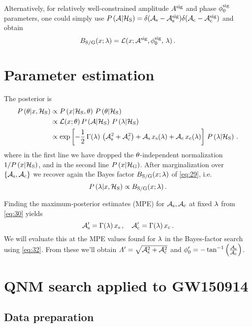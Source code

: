 \documentclass[aps,prd,onecolumn,notitlepage,nofootinbib,superscriptaddress,altaffilletter,floatfix]{revtex4-1}
\begin{document}
Alternatively, for relatively well-constrained amplitude $A^{{\mathrm{sig}}}$ and phase $\phi_0^{\mathrm{sig}}$ parameters, one could simply use $P\left(\mathcal{A}|\mathcal{H}_{\mathrm{S}}\right) = \delta(\mathcal{A}_{\mathrm{s}}-\mathcal{A}_{\mathrm{s}}^{\mathrm{sig}})\delta(\mathcal{A}_{\mathrm{c}}-\mathcal{A}_{\mathrm{c}}^{\mathrm{sig}})$ and obtain
\begin{equation}
  \label{eq:24}
  B_{\mathrm{S/G}}(x;\lambda) = \mathcal{L}(x;\mathcal{A}^{\mathrm{sig}},\phi_0^{\mathrm{sig}},\,\lambda)\,.
\end{equation}

\section{Parameter estimation}
\label{sec:parameter-estimation}

The posterior is
\begin{align}
  \label{eq:30}
  P\left(\theta|x,\mathcal{H}_{\mathrm{S}}\right) &\propto P\left(x|\mathcal{H}_{\mathrm{S}},\theta\right)\,P\left(\theta|\mathcal{H}_{\mathrm{S}}\right)\\
    &\propto \mathcal{L}(x;\theta)\,P\left(\mathcal{A}|\mathcal{H}_{\mathrm{S}}\right)\,P\left(\lambda|\mathcal{H}_{\mathrm{S}}\right)\\
    &\propto \exp\left[-\frac{1}{2}\,\Gamma(\lambda)\,\left(\mathcal{A}_{\mathrm{s}}^2+\mathcal{A}_{\mathrm{c}}^2\right) + \mathcal{A}_{\mathrm{s}}\,x_{\mathrm{s}}(\lambda) + \mathcal{A}_{\mathrm{c}}\,x_{\mathrm{c}}(\lambda)\right]\,P\left(\lambda|\mathcal{H}_{\mathrm{S}}\right)\,.
\end{align}
where in the first line we have dropped the $\theta$-independent normalization $1/P\left(x|\mathcal{H}_{\mathrm{S}}\right)$, and in the second line $P\left(x|\mathcal{H}_{\mathrm{G}}\right)$.
After marginalization over $\{\mathcal{A}_{\mathrm{s}},\mathcal{A}_{\mathrm{c}}\}$ we recover again the Bayes factor $B_{\mathrm{S/G}}(x;\lambda)$ of \eqref{eq:29}, i.e.
\begin{equation}
  \label{eq:32}
  P\left(\lambda|x,\mathcal{H}_{\mathrm{S}}\right) \propto B_{\mathrm{S/G}}(x;\lambda)\,.
\end{equation}

Finding the maximum-posterior estimates (MPE) for $\mathcal{A}_{\mathrm{s}},\mathcal{A}_{\mathrm{c}}$ at fixed $\lambda$ from \eqref{eq:30} yields
\begin{equation}
  \label{eq:31}
  \mathcal{A}_{\mathrm{s}}' = \Gamma(\lambda)\,x_{\mathrm{s}}\,,\quad
  \mathcal{A}_{\mathrm{c}}' = \Gamma(\lambda)\,x_{\mathrm{c}}\,.
\end{equation}
We will evaluate this at the MPE values found for $\lambda$ in the Bayes-factor search using \eqref{eq:32}.
From these we'll obtain $A' = \sqrt{\mathcal{A}_{\mathrm{s}}^2+\mathcal{A}_{\mathrm{c}}^2}$ and $\phi_0' = - \tan^{-1}\left(\frac{\mathcal{A}_{\mathrm{s}}}{\mathcal{A}_{\mathrm{c}}}\right)$.


\section{QNM search applied to GW150914}
\label{sec:qnm-search-applied}

\subsection{Data preparation}
\label{sec:data-preparation}
\end{document}
